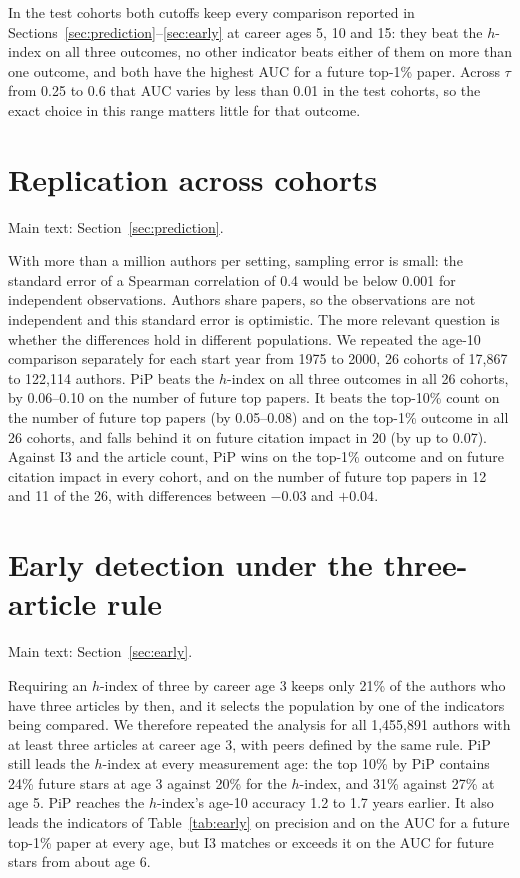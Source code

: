 \documentclass[11pt]{article}
\begin{document}
In the test cohorts both cutoffs keep every comparison reported in Sections~\ref{sec:prediction}--\ref{sec:early} at
career ages 5, 10 and 15: they beat the $h$-index on all three outcomes, no other indicator beats either of them on more
than one outcome, and both have the highest AUC for a future top-1\% paper. Across $\tau$ from 0.25 to 0.6 that AUC
varies by less than 0.01 in the test cohorts, so the exact choice in this range matters little for that outcome.

\section{Replication across cohorts}
\label{supp:cohorts}
\noindent Main text: Section~\ref{sec:prediction}.\par\nopagebreak

With more than a million authors per setting, sampling error is small: the
standard error of a Spearman correlation of 0.4 would be below 0.001 for independent observations. Authors share
papers, so the observations are not independent and this standard error is optimistic. The more relevant question is
whether the differences hold in different populations. We repeated the age-10 comparison separately for each start
year from 1975 to 2000, 26 cohorts of 17,867 to 122,114 authors. PiP beats the $h$-index on all three outcomes in all
26 cohorts, by 0.06--0.10 on the number of future top papers. It beats the top-10\% count on the number of future top
papers (by 0.05--0.08) and on the top-1\% outcome in all 26 cohorts, and falls behind it on future citation impact in
20 (by up to 0.07). Against I3 and the article count, PiP wins on the top-1\% outcome and on future citation impact in
every cohort, and on the number of future top papers in 12 and 11 of the 26, with differences between $-0.03$ and
$+0.04$.

\section{Early detection under the three-article rule}
\label{supp:min3early}
\noindent Main text: Section~\ref{sec:early}.\par\nopagebreak

Requiring an $h$-index of three by career age 3 keeps only 21\% of the authors who have three articles by then, and it
selects the population by one of the indicators being compared. We therefore repeated the analysis for all 1,455,891
authors with at least three articles at career age 3, with peers defined by the same rule. PiP still leads the $h$-index
at every measurement age: the top 10\% by PiP contains 24\% future stars at age 3 against 20\% for the $h$-index, and
31\% against 27\% at age 5. PiP reaches the $h$-index's age-10 accuracy 1.2 to 1.7 years earlier. It also leads the
indicators of Table~\ref{tab:early} on precision and on the AUC for a future top-1\% paper at every age, but I3 matches
or exceeds it on the AUC for future stars from about age 6.
\end{document}
